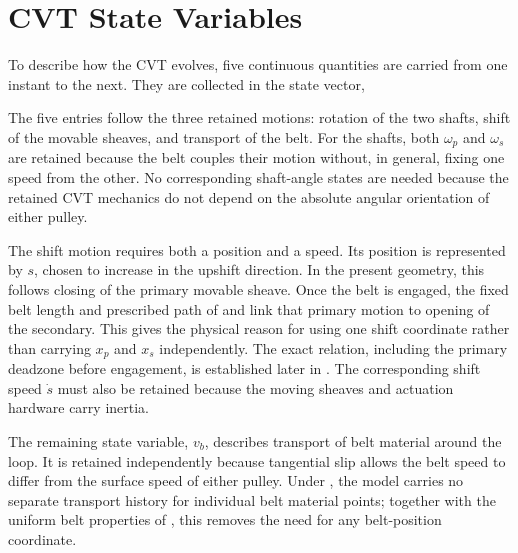 \documentclass[11pt]{report}
\numberwithin{equation}{section}
\newcommand{\vect}[1]{\bm{#1}}
\newcounter{assump}
\begin{document}


\section{CVT State Variables}
\label{sec:continuous_state_variables}

To describe how the CVT evolves, five continuous quantities are carried from 
one instant to the next. They are collected in the state vector,

\bigeq{eq:state-vector}{State Vector}{
\vect{x}(t)=
\begin{bmatrix}
\omega_p \\
\omega_s \\
s \\
\dot{s} \\
v_b
\end{bmatrix}
}

The five entries follow the three retained motions: rotation of the two shafts,
shift of the movable sheaves, and transport of the belt. For the shafts, both
\(\omega_p\) and \(\omega_s\) are retained because the belt couples their
motion without, in general, fixing one speed from the other. No corresponding
shaft-angle states are needed because the retained CVT mechanics do not depend
on the absolute angular orientation of either pulley.

The shift motion requires both a position and a speed. Its position is
represented by \(s\), chosen to increase in the upshift direction. In the
present geometry, this follows closing of the primary movable sheave. Once the
belt is engaged, the fixed belt length and prescribed path of
 and
 link that primary motion to opening of the
secondary. This gives the physical reason for using one shift coordinate
rather than carrying \(x_p\) and \(x_s\) independently. The exact relation,
including the primary deadzone before engagement, is established later in 
. The corresponding shift speed \(\dot{s}\) 
must also be retained because the moving sheaves and actuation hardware carry inertia. 

The remaining state variable, \(v_b\), describes transport of belt material
around the loop. It is retained independently because tangential slip allows
the belt speed to differ from the surface speed of either pulley. Under
, the model carries no separate transport
history for individual belt material points; together with the uniform belt
properties of , this removes the need
for any belt-position coordinate.
\end{document}
